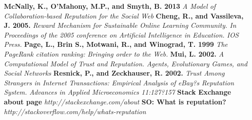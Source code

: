 \documentclass[]{final_report}
\begin{document}
\newpage
\begin{thebibliography}{99}

\textbf{McNally, K., O'Mahony, M.P., and Smyth, B. 2013} \textsl{A Model of Collaboration-based Reputation for the Social Web}
\linebreak
\linebreak
\textbf{Cheng, R., and Vassileva, J. 2005.} \textsl{Reward Mechanism for Sustainable Online Learning Community. In Proceedings of the 2005 conference on Artificial Intelligence in Education. IOS Press.}
\linebreak
\linebreak
\textbf{Page, L., Brin S., Motwani, R., and Winograd, T. 1999} \textsl{The PageRank citation ranking: Bringing order to the Web.}
\linebreak
\linebreak
\textbf{Mui, L. 2002.} \textsl{A Computational Model of Trust and Reputation. Agents, Evolutionary Games, and Social Networks}
\linebreak
\linebreak
\textbf{Resnick, P., and Zeckhauser, R. 2002.} \textsl{Trust Among Strangers in Internet Transactions: Empirical Analysis of eBay?s Reputation System. Advances in Applied Microeconomics 11:127?157}
\linebreak
\linebreak
\textbf{Stack Exchange about page} \textsl{http://stackexchange.com/about}
\linebreak
\linebreak
\textbf{SO: What is reputation?} \textsl{http://stackoverflow.com/help/whats-reputation}

\end{thebibliography}
\label{endpage}
\end{document}
